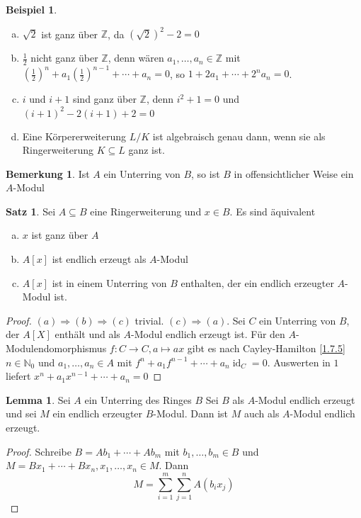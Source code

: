 \documentclass[
twoside=semi,
fontsize=12,
DIV=12, 
cleardoublepage=current,
leqno,
headings=optiontoheadandtoc, 
toc=idx
]{scrbook}
\newcommand{\N}{\mathbb{N}}
\newcommand{\Z}{\mathbb{Z}}
\newcommand{\brac}[1]{\left( #1 \right)}
\DeclareMathOperator{\id}{id}
\theoremstyle{definition}
\newtheorem{bemerkung}[definition]{Bemerkung}
\newtheorem{beispiel}[definition]{Beispiel}
\newtheorem{satz}[definition]{Satz}
\newtheorem{lemma}[definition]{Lemma}
\begin{document}
	\begin{beispiel}\label{2.1.3}
		\begin{enumerate}[(a)]
			\item $\sqrt{2}$ ist ganz \"uber $\Z$, da $(\sqrt{2})^2 -2 = 0$
			\item $\frac{1}{2}$ nicht ganz \"uber $\Z$, denn w\"aren $a_1,\dots, a_n \in \Z$ mit $\brac{\frac{1}{2}}^n + a_1\brac{\frac{1}{2}}^{n-1} + \cdots + a_n = 0$, so $1 + 2a_1 + \cdots + 2^na_n = 0$.
			\item $i$ und $i+1$ sind ganz \"uber $\Z$, denn $i^2+1 = 0$ und $(i+1)^2 - 2(i+1)+2 = 0$
			\item Eine K\"orpererweiterung $L/K$ ist algebraisch genau dann, wenn sie als Ringerweiterung $K \subseteq L$ ganz ist.
		\end{enumerate}	
	\end{beispiel}

	\begin{bemerkung}\label{2.1.4}
		Ist $A$ ein Unterring von $B$, so ist $B$ in offensichtlicher Weise ein $A$-Modul
	\end{bemerkung}

	\begin{satz}\label{2.1.5}
		Sei $A \subseteq B$ eine Ringerweiterung und $x \in B$. Es sind \"aquivalent
		\begin{enumerate}[(a)]
			\item $x$ ist ganz \"uber $A$
			\item $A[x]$ ist endlich erzeugt als $A$-Modul
			\item $A[x]$ ist in einem Unterring von $B$ enthalten, der ein endlich erzeugter $A$-Modul ist.
		\end{enumerate}
	
		\begin{proof}
			$(a)\Rightarrow (b)\Rightarrow(c)$ trivial.\newline
			$(c) \Rightarrow (a)$. Sei $C$ ein Unterring von $B$, der $A[X]$ enth\"alt und als $A$-Modul endlich erzeugt ist.
			F\"ur den $A$-Modulendomorphismus $f:C\to C, a\mapsto ax$ gibt es nach Cayley-Hamilton \ref{1.7.5} $n\in\N_0$ und $a_1,\dots, a_n\in A$ mit 
			$f^n +a_1f^{n-1}+\cdots+a_n\id_C= 0$. Auswerten in $1$ liefert $x^n+a_1x^{n-1}+\cdots+a_n = 0$ 
 		\end{proof}
	\end{satz}

	\begin{lemma}\label{2.1.6}
		Sei $A$ ein Unterring des Ringes $B$ Sei $B$ als $A$-Modul endlich erzeugt und sei $M$ ein endlich erzeugter $B$-Modul. Dann ist $M$ auch als $A$-Modul endlich erzeugt.
		
		\begin{proof}
			Schreibe $B=Ab_1 + \cdots + Ab_m$ mit $b_1, \dots, b_m \in B$ und $M = Bx_1 + \cdots + Bx_n, x_1, \dots, x_n \in M$. Dann 
			\[M = \sum_{i=1}^{m} \sum_{j=1}^{n} A(b_ix_j)\]
		\end{proof}
	\end{lemma}
	
\end{document}
